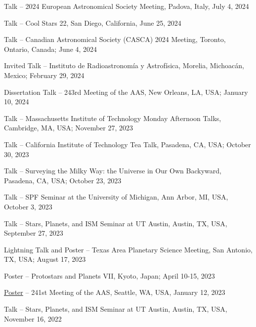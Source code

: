 \documentclass[12pt,a4paper,sans,xetex]{moderncv}        %
\begin{document}
\begin{etaremune}[topsep=0pt,itemsep=0pt,partopsep=0pt,parsep=0pt]
\item Talk -- 2024 European Astronomical Society Meeting, Padova, Italy, July 4, 2024

\item Talk -- Cool Stars 22, San Diego, California, June 25, 2024

\item Talk -- Canadian Astronomical Society (CASCA) 2024 Meeting, Toronto, Ontario, Canada; June 4, 2024 

\item Invited Talk -- Instituto de Radioastronomía y Astrofísica, Morelia, Michoac\'an, Mexico; February 29, 2024

\item Dissertation Talk -- 243rd Meeting of the AAS, New Orleans, LA, USA; January 10, 2024

\item Talk -- Massachusetts Institute of Technology Monday Afternoon Talks, Cambridge, MA, USA; November 27, 2023

\item Talk -- California Institute of Technology Tea Talk, Pasadena, CA, USA; October 30, 2023

\item Talk -- Surveying the Milky Way: the Universe in Our Own Backyward, Pasadena, CA, USA; October 23, 2023

\item Talk -- SPF Seminar at the University of Michigan, Ann Arbor, MI, USA, October 3, 2023

\item Talk -- Stars, Planets, and ISM Seminar at UT Austin, Austin, TX, USA, September 27, 2023

\item Lightning Talk and Poster -- Texas Area Planetary Science Meeting, San Antonio, TX, USA; August 17, 2023

\item Poster -- Protostars and Planets VII, Kyoto, Japan; April 10-15, 2023

\item \href{https://ui.adsabs.harvard.edu/abs/2023AAS...24140206K/abstract}{Poster} -- 241st Meeting of the AAS, Seattle, WA, USA, January 12, 2023

\item Talk -- Stars, Planets, and ISM Seminar at UT Austin, Austin, TX, USA, November 16, 2022


\end{etaremune}
\end{document}
